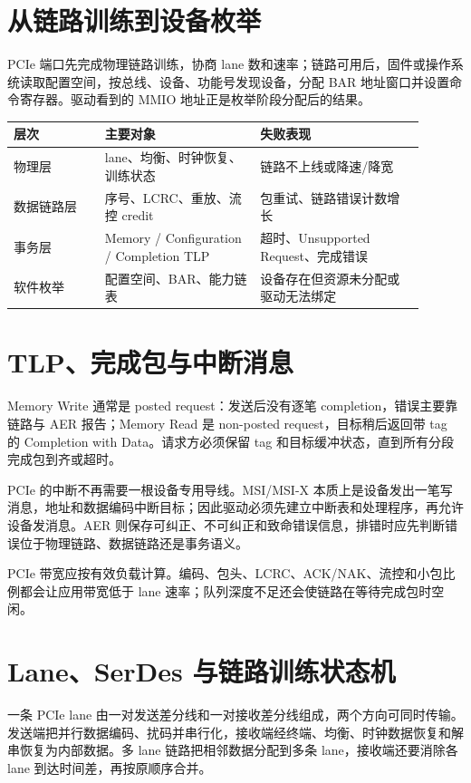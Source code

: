 \section{从链路训练到设备枚举}

PCIe 端口先完成物理链路训练，协商 lane 数和速率；链路可用后，固件或操作系统读取配置空间，按总线、设备、功能号发现设备，分配 BAR 地址窗口并设置命令寄存器。驱动看到的 MMIO 地址正是枚举阶段分配后的结果。

\begin{longtable}{L{0.2\linewidth}L{0.34\linewidth}L{0.36\linewidth}}
\toprule
层次 & 主要对象 & 失败表现 \\
\midrule
物理层 & lane、均衡、时钟恢复、训练状态 & 链路不上线或降速/降宽 \\
数据链路层 & 序号、LCRC、重放、流控 credit & 包重试、链路错误计数增长 \\
事务层 & Memory / Configuration / Completion TLP & 超时、Unsupported Request、完成错误 \\
软件枚举 & 配置空间、BAR、能力链表 & 设备存在但资源未分配或驱动无法绑定 \\
\bottomrule
\end{longtable}

\section{TLP、完成包与中断消息}

Memory Write 通常是 posted request：发送后没有逐笔 completion，错误主要靠链路与 AER 报告；Memory Read 是 non-posted request，目标稍后返回带 tag 的 Completion with Data。请求方必须保留 tag 和目标缓冲状态，直到所有分段完成包到齐或超时。

PCIe 的中断不再需要一根设备专用导线。MSI/MSI-X 本质上是设备发出一笔写消息，地址和数据编码中断目标；因此驱动必须先建立中断表和处理程序，再允许设备发消息。AER 则保存可纠正、不可纠正和致命错误信息，排错时应先判断错误位于物理链路、数据链路还是事务语义。

\begin{classicnote}
PCIe 带宽应按有效负载计算。编码、包头、LCRC、ACK/NAK、流控和小包比例都会让应用带宽低于 lane 速率；队列深度不足还会使链路在等待完成包时空闲。
\end{classicnote}

\section{Lane、SerDes 与链路训练状态机}

一条 PCIe lane 由一对发送差分线和一对接收差分线组成，两个方向可同时传输。发送端把并行数据编码、扰码并串行化，接收端经终端、均衡、时钟数据恢复和解串恢复为内部数据。多 lane 链路把相邻数据分配到多条 lane，接收端还要消除各 lane 到达时间差，再按原顺序合并。

